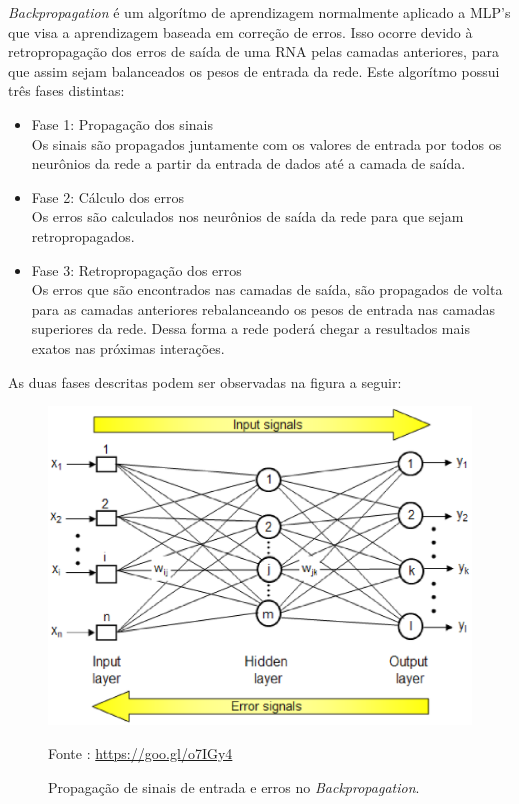 \textit{Backpropagation} é um algorítmo de aprendizagem normalmente aplicado a MLP's que visa a aprendizagem baseada em correção de erros. Isso ocorre devido à retropropagação dos erros de saída de uma RNA pelas camadas anteriores, para que assim sejam balanceados os pesos de entrada da rede.
Este algorítmo possui três fases distintas:

\begin{itemize}
    \item Fase 1: Propagação dos sinais \\ Os sinais são propagados juntamente com os valores de entrada por todos os neurônios da rede a partir da entrada de dados até a camada de saída.
    \item Fase 2: Cálculo dos erros \\ Os erros são calculados nos neurônios de saída da rede para que sejam retropropagados.
    \item Fase 3: Retropropagação dos erros \\ Os erros que são encontrados nas camadas de saída, são propagados de volta para as camadas anteriores rebalanceando os pesos de entrada nas camadas superiores da rede. \cite{netto2006} Dessa forma a rede poderá chegar a resultados mais exatos nas próximas interações.
\end{itemize}

As duas fases descritas podem ser observadas na figura a seguir:

\begin{figure}[ht]
        \centering
        \label{fig05}
            \includegraphics[keepaspectratio=true, scale=0.4]{editaveis/images/backprop.eps}
        \caption{Propagação de sinais de entrada e erros no \textit{Backpropagation}.}
        Fonte : \url{https://goo.gl/o7IGy4}
\end{figure}

